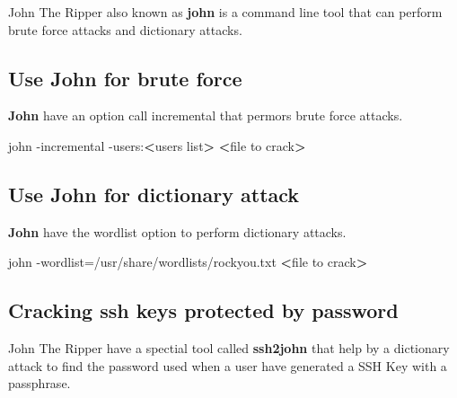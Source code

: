 \documentclass{assets/ipesethesis}
\newenvironment{Shaded}{\begin{snugshade}}{\end{snugshade}}
\newcommand{\ExtensionTok}[1]{#1}
\newcommand{\NormalTok}[1]{#1}
\newcommand{\OperatorTok}[1]{\textcolor[rgb]{0.81,0.36,0.00}{\textbf{#1}}}
\begin{document}
John The Ripper also known as \textbf{john} is a command line tool that can perform brute force attacks and dictionary attacks.

\hypertarget{use-john-for-brute-force}{%
\subsection*{Use John for brute force}\label{use-john-for-brute-force}}

\textbf{John} have an option call incremental that permors brute force attacks.

\begin{Shaded}
\begin{Highlighting}[]
\ExtensionTok{john}\NormalTok{ -incremental -users:}\OperatorTok{<}\NormalTok{users list}\OperatorTok{>} \OperatorTok{<}\NormalTok{file to crack}\OperatorTok{>}
\end{Highlighting}
\end{Shaded}

\hypertarget{use-john-for-dictionary-attack}{%
\subsection*{Use John for dictionary attack}\label{use-john-for-dictionary-attack}}

\textbf{John} have the wordlist option to perform dictionary attacks.

\begin{Shaded}
\begin{Highlighting}[]
\ExtensionTok{john}\NormalTok{ -wordlist=/usr/share/wordlists/rockyou.txt }\OperatorTok{<}\NormalTok{file to crack}\OperatorTok{>}
\end{Highlighting}
\end{Shaded}

\hypertarget{cracking-ssh-keys-protected-by-password}{%
\subsection*{Cracking ssh keys protected by password}\label{cracking-ssh-keys-protected-by-password}}

John The Ripper have a spectial tool called \textbf{ssh2john} that help by a dictionary attack to find the
password used when a user have generated a SSH Key with a passphrase.
\end{document}
